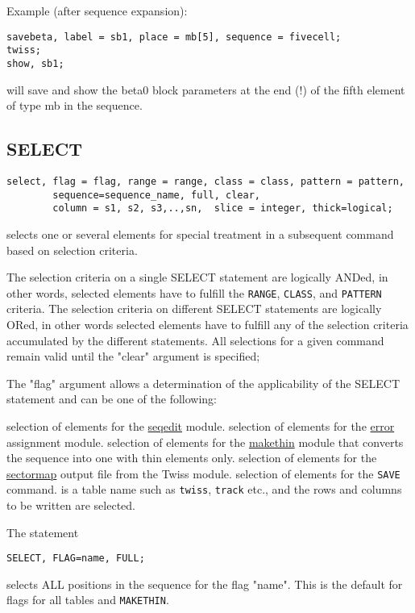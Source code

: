 Example (after sequence expansion): 
\begin{verbatim}
savebeta, label = sb1, place = mb[5], sequence = fivecell;
twiss;
show, sb1;
\end{verbatim} 
will save and show the beta0 block parameters at the end (!) of the
fifth element of type mb in the sequence.  


\subsection{SELECT} 
\begin{verbatim}
select, flag = flag, range = range, class = class, pattern = pattern,
        sequence=sequence_name, full, clear,
        column = s1, s2, s3,..,sn,  slice = integer, thick=logical;
\end{verbatim} 
selects one or several elements for special treatment in a subsequent
command based on selection criteria.

The selection criteria on a single SELECT statement are logically
ANDed, in other words, selected elements have to fulfill the {\tt RANGE},
{\tt CLASS}, and {\tt PATTERN} criteria.  
The selection criteria on different SELECT statements are logically
ORed, in other words selected elements have to fulfill any of the
selection criteria accumulated by the different statements.   
All selections for a given command remain valid until the "clear" argument
is specified; 

The "flag" argument allows a determination of the applicability of the
SELECT statement and can be one of the following: 
\begin{madlist}
    selection of elements for the
     \href{seqedit.html}{seqedit} module.  
    selection of elements for the
     \href{../error/error.html}{error} assignment module.  
    selection of elements for the
     \href{../makethin/makethin.html}{makethin} module that
     converts the sequence into one with thin elements only.  
    selection of elements for the
     \href{../Introduction/sectormap.html}{sectormap} output file
     from the Twiss module.  
    selection of elements for the {\tt SAVE} command.  
    is a table name such as {\tt twiss}, {\tt track}
     etc., and the rows and columns to be written are selected.  
\end{madlist} 

The statement
\begin{verbatim}
SELECT, FLAG=name, FULL;
\end{verbatim} 
selects ALL positions in the sequence for the flag "name". This is the default
for flags for all tables and {\tt MAKETHIN}.


